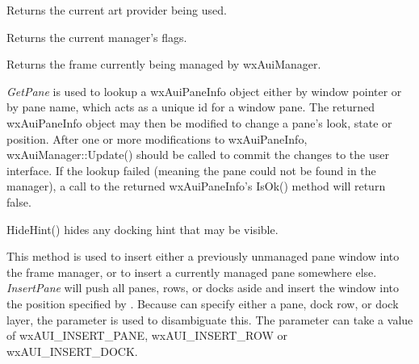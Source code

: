 
Returns the current art provider being used.

\label{wxauimanagergetflags}


Returns the current manager's flags.

\label{wxauimanagergetmanagedwindow}


Returns the frame currently being managed by wxAuiManager.

\label{wxauimanagergetpane}



{\it GetPane} is used to lookup a wxAuiPaneInfo object
either by window pointer or by pane name, which acts as a unique id for
a window pane. The returned wxAuiPaneInfo object may then be modified to
change a pane's look, state or position. After one or more
modifications to wxAuiPaneInfo, wxAuiManager::Update() should be called
to commit the changes to the user interface. If the lookup failed
(meaning the pane could not be found in the manager), a call to the
returned wxAuiPaneInfo's IsOk() method will return false.

\label{wxauimanagerhidehint}


HideHint() hides any docking hint that may be visible.

\label{wxauimanagerinsertpane}


This method is used to insert either a previously unmanaged pane window
into the frame manager, or to insert a currently managed pane somewhere 
else. {\it InsertPane} will push all panes, rows, or docks aside and
insert the window into the position specified by . 
Because  can specify either a pane, dock row, or dock
layer, the  parameter is used to disambiguate this. The
parameter  can take a value of wxAUI\_INSERT\_PANE, wxAUI\_INSERT\_ROW 
or wxAUI\_INSERT\_DOCK.

